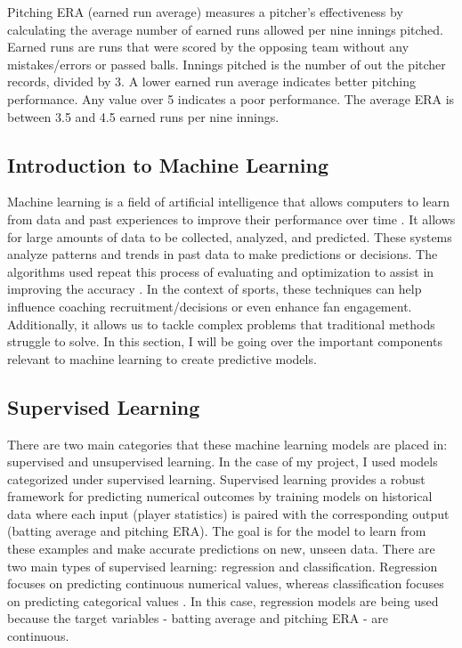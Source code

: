 \documentclass[10pt,twocolumn]{article}
\begin{document}
    Pitching ERA (earned run average) measures a pitcher’s effectiveness by calculating the average number of earned runs allowed per nine innings pitched. Earned runs are runs that were scored by the opposing team without any mistakes/errors or passed balls. Innings pitched is the number of out the pitcher records, divided by 3. A lower earned run average indicates better pitching performance. Any value over 5 indicates a poor performance. The average ERA is between 3.5 and 4.5 earned runs per nine innings. 

\subsection{Introduction to Machine Learning}

Machine learning is a field of artificial intelligence that allows computers to learn from data and past experiences to improve their performance over time \cite{3}. It allows for large amounts of data to be collected, analyzed, and predicted. These systems analyze patterns and trends in past data to make predictions or decisions. The algorithms used repeat this process of evaluating and optimization to assist in improving the accuracy \cite{4}. In the context of sports, these techniques can help influence coaching recruitment/decisions or even enhance fan engagement. Additionally, it allows us to tackle complex problems that traditional methods struggle to solve. In this section, I will be going over the important components relevant to machine learning to create predictive models.  

\subsection{Supervised Learning}

    There are two main categories that these machine learning models are placed in: supervised and unsupervised learning. In the case of my project, I used models categorized under supervised learning. Supervised learning provides a robust framework for predicting numerical outcomes by training models on historical data where each input (player statistics) is paired with the corresponding output (batting average and pitching ERA). The goal is for the model to learn from these examples and make accurate predictions on new, unseen data. There are two main types of supervised learning: regression and classification. Regression focuses on predicting continuous numerical values, whereas classification focuses on predicting categorical values \cite{5}. In this case, regression models are being used because the target variables - batting average and pitching ERA - are continuous. 
\end{document}
